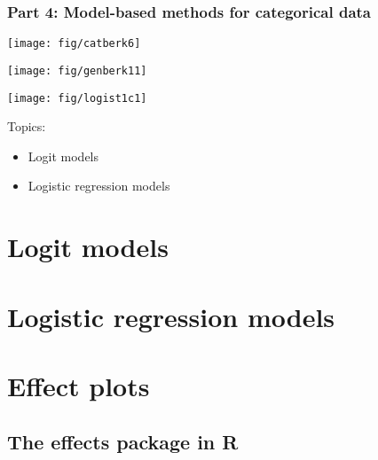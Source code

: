 \renewcommand{\FileName}{vcdpart3}
\begin{frame}
  \frametitle{Part 4: Model-based methods for categorical data}
 \begin{minipage}[c]{.33\textwidth}
  \texttt{[image: fig/catberk6]}
  \end{minipage}%
 \hfill
 \begin{minipage}[c]{.33\textwidth}
  \texttt{[image: fig/genberk11]}
 \end{minipage}
 \hfill
 \begin{minipage}[c]{.33\textwidth}
  \texttt{[image: fig/logist1c1]}
 \end{minipage}

Topics:
  \begin{itemize}
    \item Logit models
	\item Logistic regression models
  \end{itemize}
\end{frame}

\section{Logit models}

\section{Logistic regression models}


\section{Effect plots}

\subsection{The effects package in R}

